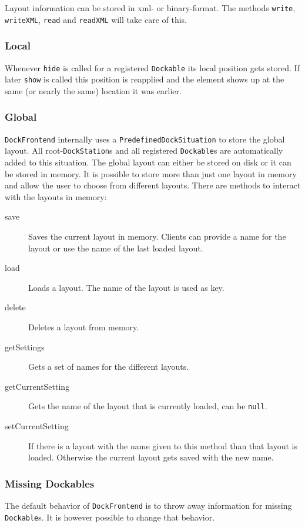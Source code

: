 \documentclass[a4paper,10pt]{article}
\newcommand{\src}[1]{\texttt{#1}}
\begin{document}
Layout information can be stored in xml- or binary-format. The methods \src{write}, \src{writeXML}, \src{read} and \src{readXML} will take care of this.

\subsubsection{Local}
Whenever \src{hide} is called for a registered \src{Dockable} its local position gets stored. If later \src{show} is called this position is reapplied and the element shows up at the same (or nearly the same) location it was earlier.

\subsubsection{Global}
\src{DockFrontend} internally uses a \src{PredefinedDockSituation} to store the global layout. All root-\src{DockStation}s and all registered \src{Dockable}s are automatically added to this situation. The global layout can either be stored on disk or it can be stored in memory. It is possible to store more than just one layout in memory and allow the user to choose from different layouts. There are methods to interact with the layouts in memory:

\begin{description}
 \item[save] Saves the current layout in memory. Clients can provide a name for the layout or use the name of the last loaded layout.
 \item[load] Loads a layout. The name of the layout is used as key.
 \item[delete] Deletes a layout from memory.
 \item[getSettings] Gets a set of names for the different layouts.
 \item[getCurrentSetting] Gets the name of the layout that is currently loaded, can be \src{null}.
 \item[setCurrentSetting] If there is a layout with the name given to this method than that layout is loaded. Otherwise the current layout gets saved with the new name.
\end{description}

\subsubsection{Missing Dockables}
The default behavior of \src{DockFrontend} is to throw away information for missing \src{Dockable}s. It is however possible to change that behavior.
\end{document}
